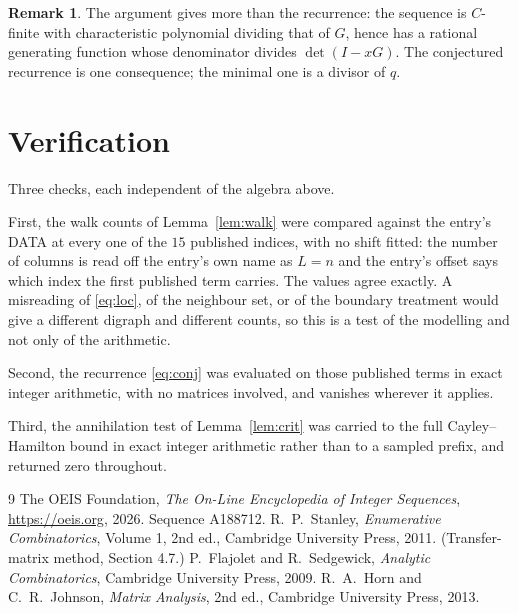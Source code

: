 \documentclass[11pt,a4paper]{article}
\theoremstyle{plain}
\theoremstyle{definition}
\newtheorem{remark}[theorem]{Remark}
\begin{document}
\begin{remark}
The argument gives more than the recurrence: the sequence is $C$-finite with characteristic
polynomial dividing that of $G$, hence has a rational generating function whose denominator
divides $\det(I-xG)$. The conjectured recurrence is one consequence; the minimal one is a
divisor of $q$.
\end{remark}

\section{Verification}

Three checks, each independent of the algebra above.

First, the walk counts of Lemma~\ref{lem:walk} were compared against the entry's DATA at
every one of the $15$ published indices, with no shift fitted: the number of columns is
read off the entry's own name as $L=n$ and the entry's offset says which index the first
published term carries. The values agree exactly. A misreading of \eqref{eq:loc}, of the
neighbour set, or of the boundary treatment would give a different digraph and different
counts, so this is a test of the modelling and not only of the arithmetic.

Second, the recurrence \eqref{eq:conj} was evaluated on those published terms in exact
integer arithmetic, with no matrices involved, and vanishes wherever it applies.

Third, the annihilation test of Lemma~\ref{lem:crit} was carried to the full
Cayley--Hamilton bound in exact integer arithmetic rather than to a sampled prefix, and
returned zero throughout.

\begin{thebibliography}{9}
 The OEIS Foundation, \emph{The On-Line Encyclopedia of Integer
Sequences}, \url{https://oeis.org}, 2026. Sequence A188712.
 R.~P.~Stanley, \emph{Enumerative Combinatorics}, Volume 1, 2nd ed.,
Cambridge University Press, 2011. (Transfer-matrix method, Section 4.7.)
 P.~Flajolet and R.~Sedgewick, \emph{Analytic Combinatorics}, Cambridge
University Press, 2009.
 R.~A.~Horn and C.~R.~Johnson, \emph{Matrix Analysis}, 2nd ed., Cambridge
University Press, 2013.
\end{thebibliography}
\end{document}

